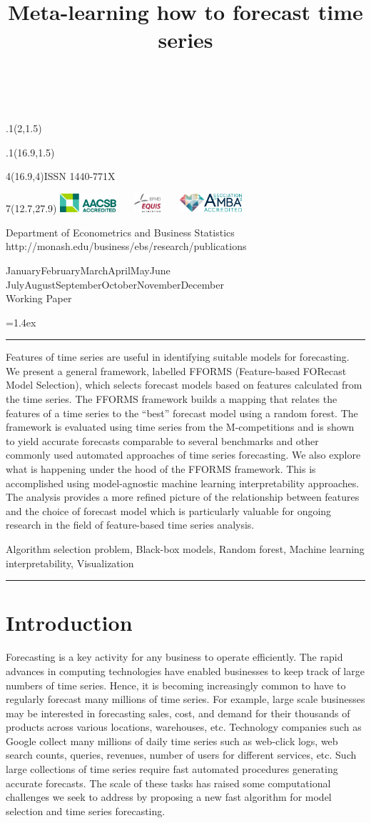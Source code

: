 \documentclass[11pt,a4paper,]{article}
\title{Meta-learning how to forecast time series}
\date{\sf\Date~\Month~\Year}
\makeatletter
\def\Date{\number\day}
\def\Month{\ifcase\month\or
 January\or February\or March\or April\or May\or June\or
 July\or August\or September\or October\or November\or December\fi}
\def\Year{\number\year}
\def\showjel{{\large\textsf{\textbf{JEL classification:}}~\@jel}}
\def\cover{{\sffamily\setcounter{page}{0}
        \thispagestyle{empty}
        \placefig{2}{1.5}{width=5cm}{monash2}
        \placefig{16.9}{1.5}{width=2.1cm}{MBusSchool}
        \begin{textblock}{4}(16.9,4)ISSN 1440-771X\end{textblock}
        \begin{textblock}{7}(12.7,27.9)\hfill
        \includegraphics[height=0.7cm]{AACSB}~~~
        \includegraphics[height=0.7cm]{EQUIS}~~~
        \includegraphics[height=0.7cm]{AMBA}
        \end{textblock}
        \vspace*{2cm}
        \begin{center}\Large
        Department of Econometrics and Business Statistics\\[.5cm]
        \footnotesize http://monash.edu/business/ebs/research/publications
        \end{center}\vspace{2cm}
        \begin{center}
        \fbox{\parbox{14cm}{\begin{onehalfspace}\centering\Huge\vspace*{0.3cm}
                \textsf{\textbf{\expandafter{\@title}}}\vspace{1cm}\par
                \LARGE\@author\end{onehalfspace}
        }}
        \end{center}
        \vfill
                \begin{center}\Large
                \Month~\Year\\[1cm]
                Working Paper \@wp
        \end{center}\vspace*{2cm}}}
\def\pageone{{\sffamily\setstretch{1}%
        \thispagestyle{empty}%
        \vbox to \textheight{%
        \raggedright\baselineskip=1.2cm
     {\fontsize{24.88}{30}\sffamily\textbf{\expandafter{\@title}}}
        \vspace{2cm}\par
        \hspace{1cm}\parbox{14cm}{\sffamily\large\@addresses}\vspace{1cm}\vfill
        \hspace{1cm}{\large\Date~\Month~\Year}\\[1cm]
        \hspace{1cm}\showjel\vss}}}
\def\blindtitle{{\sffamily
     \thispagestyle{plain}\raggedright\baselineskip=1.2cm
     {\fontsize{24.88}{30}\sffamily\textbf{\expandafter{\@title}}}\vspace{1cm}\par
        }}
\def\titlepage{{\cover\newpage\pageone\newpage\blindtitle}}
\let\maketitle\titlepage
\newenvironment{keywords}{\par\vspace{0.5cm}\noindent{\sffamily\textbf{Keywords:}}}{\vspace{0.25cm}\par\hrule\vspace{0.5cm}\par}
\renewenvironment{abstract}{\begin{minipage}{\textwidth}\parskip=1.4ex\noindent
\hrule\vspace{0.1cm}\par{\sffamily\textbf{\abstractname}}\newline}
  {\end{minipage}}
\def\placefig#1#2#3#4{\begin{textblock}{.1}(#1,#2)\rlap{\texttt{[image: \#4]}}\end{textblock}}
\makeatother
\begin{document}
\maketitle
\begin{abstract}
Features of time series are useful in identifying suitable models for forecasting. We present a general framework, labelled FFORMS (Feature-based FORecast Model Selection), which selects forecast models based on features calculated from the time series. The FFORMS framework builds a mapping that relates the features of a time series to the ``best'' forecast model using a random forest. The framework is evaluated using time series from the M-competitions and is shown to yield accurate forecasts comparable to several benchmarks and other commonly used automated approaches of time series forecasting. We also explore what is happening under the hood of the FFORMS framework. This is accomplished using model-agnostic machine learning interpretability approaches. The analysis provides a more refined picture of the relationship between features and the choice of forecast model which is particularly valuable for ongoing research in the field of feature-based time series analysis.
\end{abstract}
\begin{keywords}
Algorithm selection problem, Black-box models, Random forest, Machine learning interpretability, Visualization
\end{keywords}

\hypertarget{introduction}{%
\section{Introduction}\label{introduction}}

Forecasting is a key activity for any business to operate efficiently. The rapid advances in computing technologies have enabled businesses to keep track of large numbers of time series. Hence, it is becoming increasingly common to have to regularly forecast many millions of time series. For example, large scale businesses may be interested in forecasting sales, cost, and demand for their thousands of products across various locations, warehouses, etc. Technology companies such as Google collect many millions of daily time series such as web-click logs, web search counts, queries, revenues, number of users for different services, etc. Such large collections of time series require fast automated procedures generating accurate forecasts. The scale of these tasks has raised some computational challenges we seek to address by proposing a new fast algorithm for model selection and time series forecasting.
\end{document}
